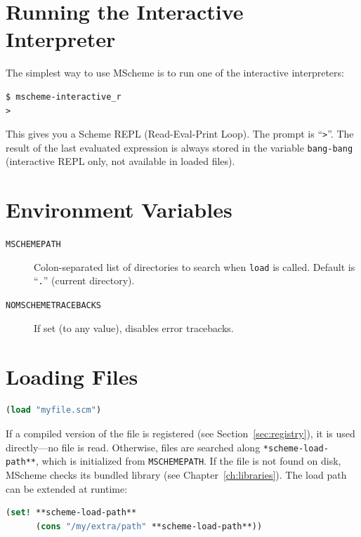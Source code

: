 \documentclass[12pt]{report}
\begin{document}
\section{Running the Interactive Interpreter}

The simplest way to use MScheme is to run one of the interactive
interpreters:

\begin{lstlisting}[language={}]
$ mscheme-interactive_r
>
\end{lstlisting}

This gives you a Scheme REPL (Read-Eval-Print Loop).  The prompt is
``{\tt >}''.  The result of the last evaluated expression is always
stored in the variable {\tt bang-bang} (interactive REPL only,
not available in loaded files).

\section{Environment Variables}

\begin{description}
\item[{\tt MSCHEMEPATH}] Colon-separated list of directories to search
  when {\tt load} is called.  Default is ``{\tt .}'' (current directory).
\item[{\tt NOMSCHEMETRACEBACKS}] If set (to any value), disables error
  tracebacks.
\end{description}

\section{Loading Files}

\begin{lstlisting}[language=Scheme]
(load "myfile.scm")
\end{lstlisting}

If a compiled version of the file is registered (see
Section~\ref{sec:registry}), it is used directly---no file is read.
Otherwise, files are searched along {\tt **scheme-load-path**}, which
is initialized from {\tt MSCHEMEPATH}.  If the file is not found on
disk, MScheme checks its bundled library (see
Chapter~\ref{ch:libraries}).
The load path can be extended at runtime:

\begin{lstlisting}[language=Scheme]
(set! **scheme-load-path**
      (cons "/my/extra/path" **scheme-load-path**))
\end{lstlisting}
\end{document}
